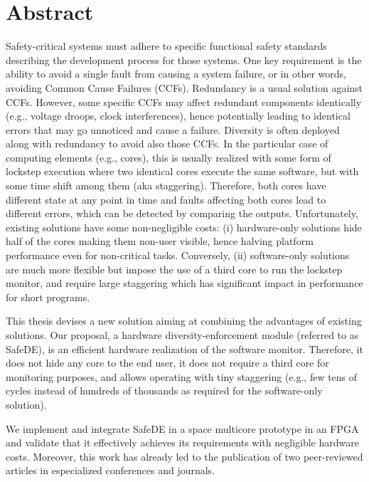 \documentclass[a4paper,12pt]{article}
\begin{document}
\newpage
\listoffigures
\listoftables

%

\clearpage
\newpage
\section*{Abstract}

Safety-critical systems must adhere to specific functional safety standards describing the development process for those systems. One key requirement is the ability to avoid a single fault from causing a system failure, or in other words, avoiding Common Cause Failures (CCFs). Redundancy is a usual solution against CCFs. However, some specific CCFs may affect redundant components identically (e.g., voltage droops, clock interferences), hence potentially leading to identical errors that may go unnoticed and cause a failure.
Diversity is often deployed along with redundancy to avoid also those CCFs. In the particular case of computing elements (e.g., cores), this is usually realized with some form of lockstep execution where two identical cores execute the same software, but with some time shift among them (aka staggering). Therefore, both cores have different state at any point in time and faults affecting both cores lead to different errors, which can be detected by comparing the outputs.
Unfortunately, existing solutions have some non-negligible costs: (i) hardware-only solutions hide half of the cores making them non-user visible, hence halving platform performance even for non-critical tasks. Conversely, (ii) software-only solutions are much more flexible but impose the use of a third core to run the lockstep monitor, and require large staggering which has significant impact in performance for short programs.

This thesis devises a new solution aiming at combining the advantages of existing solutions. Our proposal, a hardware diversity-enforcement module (referred to as SafeDE), is an efficient hardware realization of the software monitor. Therefore, it does not hide any core to the end user, it does not require a third core for monitoring purposes, and allows operating with tiny staggering (e.g., few tens of cycles instead of hundreds of thousands as required for the software-only solution). 

We implement and integrate SafeDE in a space multicore prototype in an FPGA and validate that it effectively achieves its requirements with negligible hardware costs. Moreover, this work has already led to the publication of two peer-reviewed articles in especialized conferences and journals.
\end{document}

